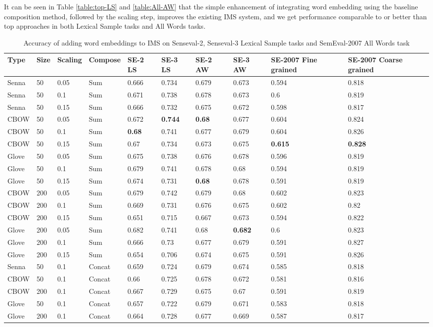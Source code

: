 It can be seen in Table \ref{table:top-LS} and \ref{table:All-AW} that the simple enhancement of integrating word embedding using the baseline composition method, followed by the scaling step, improves the existing IMS system, and we get performance comparable to or better than top approaches in both Lexical Sample tasks and All Words tasks. 

\begin{table}
	\caption{Accuracy of adding word embeddings to IMS on Senseval-2, Senseval-3 Lexical Sample tasks and SemEval-2007 All Words task}
	\label{table:full}
	\begin{center}
\begin{tabular}{|p{1cm}|p{0.5cm}|p{1cm}|p{1.5cm}|p{1.5cm}|p{1.5cm}|p{1.5cm}|p{1.5cm}|p{1.5cm}|p{1.5cm}|}
Type & Size & Scaling & Compose & SE-2 LS & SE-3 LS & SE-2 AW & SE-3 AW & SE-2007 Fine grained & SE-2007 Coarse grained \\
\hline
Senna&50&0.05&Sum&0.666&0.734&0.679&0.673&0.594&0.818 \\
\hline
Senna&50&0.1&Sum&0.671&0.738&0.678&0.673&0.6&0.819 \\
\hline
Senna&50&0.15&Sum&0.666&0.732&0.675&0.672&0.598&0.817 \\
\hline
CBOW&50&0.05&Sum&0.672&{\bf 0.744}&{\bf 0.68}&0.677&0.604&0.824\\
\hline
CBOW&50&0.1&Sum&{\bf 0.68}&0.741&0.677&0.679 &0.604 & 0.826\\
\hline
CBOW&50&0.15&Sum&0.67&0.734&0.673&0.675&{\bf 0.615}&{\bf 0.828}\\
\hline
Glove&50&0.05&Sum&0.675&0.738&0.676&0.678&0.596&0.819 \\
\hline
Glove&50&0.1&Sum&0.679&0.741&0.678&0.68&0.594&0.819 \\
\hline
Glove&50&0.15&Sum&0.674&0.731&{\bf 0.68}&0.678&0.591&0.819 \\
\hline
CBOW&200&0.05&Sum&0.679&0.742&0.679&0.68&0.602&0.823 \\
\hline
CBOW&200&0.1&Sum&0.669&0.731&0.676&0.675&0.602&0.82 \\
\hline
CBOW&200&0.15&Sum&0.651&0.715&0.667&0.673&0.594&0.822 \\
\hline
Glove&200&0.05&Sum&0.682&0.741&0.68&{\bf0.682}&0.6&0.823 \\
\hline
Glove&200&0.1&Sum&0.666&0.73&0.677&0.679&0.591&0.827 \\
\hline
Glove&200&0.15&Sum&0.654&0.706&0.674&0.675&0.591&0.826 \\
\hline
Senna&50&0.1&Concat&0.659&0.724&0.679&0.674&0.585&0.818 \\
\hline
CBOW&50&0.1&Concat&0.66&0.725&0.678&0.672&0.581&0.816\\
\hline
CBOW&200&0.1&Concat&0.667&0.729&0.675&0.67&0.591&0.819\\
\hline
Glove&50&0.1&Concat&0.657&0.722&0.679&0.671&0.583&0.818\\
\hline
Glove&200&0.1&Concat&0.664&0.728&0.677&0.669&0.587&0.817\\
\hline
\end{tabular}
	\end{center}
\end{table}

